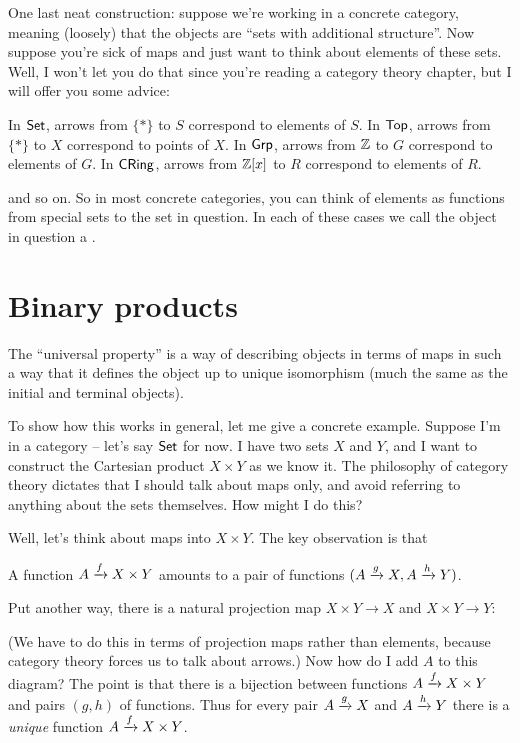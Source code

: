 One last neat construction: suppose we're working in a concrete category,
meaning (loosely) that the objects are ``sets with additional structure''.
Now suppose you're sick of maps and just want to think about elements of these sets.
Well, I won't let you do that since you're reading a category theory chapter,
but I will offer you some advice:
\begin{itemize}
	\ii In $\mathsf{Set}$, arrows from $\{\ast\}$ to $S$ correspond to elements of $S$.
	\ii In $\mathsf{Top}$, arrows from $\{\ast\}$ to $X$ correspond to points of $X$.
	\ii In $\mathsf{Grp}$, arrows from $\mathbb Z$ to $G$ correspond to elements of $G$.
	\ii In $\mathsf{CRing}$, arrows from $\mathbb Z[x]$ to $R$ correspond to elements of $R$.
\end{itemize}
and so on.
So in most concrete categories, you can think of elements as functions from special sets to the set in question.
In each of these cases we call the object in question a .

\section{Binary products}
The ``universal property'' is a way of describing objects in terms of maps
in such a way that it defines the object up to unique isomorphism
(much the same as the initial and terminal objects).

To show how this works in general, let me give a concrete example.
Suppose I'm in a category -- let's say $\mathsf{Set}$ for now.
I have two sets $X$ and $Y$, and I want to construct the Cartesian product $X \times Y$ as we know it.
The philosophy of category theory dictates that I should talk about maps only,
and avoid referring to anything about the sets themselves.
How might I do this?

Well, let's think about maps into $X \times Y$.
The key observation is that
\begin{moral}
A function $A \xrightarrow{f} X \times Y$
amounts to a pair of functions $(A \xrightarrow{g} X, A \xrightarrow{h} Y)$.
\end{moral}
Put another way, there is a natural projection map $X \times Y \to X$ and $X \times Y \to Y$:
\begin{center}
\end{center}
(We have to do this in terms of projection maps rather than elements,
because category theory forces us to talk about arrows.)
Now how do I add $A$ to this diagram?
The point is that there is a bijection between functions $A \xrightarrow{f} X \times Y$
and pairs $(g,h)$ of functions.
Thus for every pair $A \xrightarrow{g} X$ and $A \xrightarrow{h} Y$ there is a \emph{unique} function
$A \xrightarrow{f} X \times Y$.

